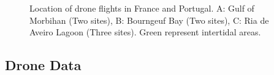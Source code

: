 \documentclass[
  number]{elsarticle}
\begin{document}
\label{cell-fig-map}
\begin{figure}[H]


\caption{\label{fig-map}Location of drone flights in France and
Portugal. A: Gulf of Morbihan (Two sites), B: Bourngeuf Bay (Two sites),
C: Ria de Aveiro Lagoon (Three sites). Green represent intertidal
areas.}

\end{figure}%

\subsection{Drone Data}\label{drone-data}
\end{document}

